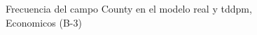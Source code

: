\begin{figure}[H]
    \centering
    
    \caption{Frecuencia del campo County en el modelo real y tddpm, Economicos (B-3)}
    \label{frecuency-County-tddpm_mlp}
\end{figure}